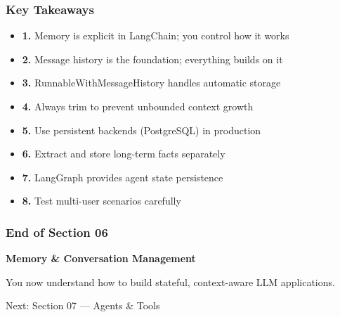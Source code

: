 \documentclass[aspectratio=169,11pt]{beamer}
\begin{document}
\begin{frame}
  \frametitle{Key Takeaways}
  \begin{itemize}
    \item \textcolor{lcgreen}{\textbf{1.}} Memory is explicit in LangChain; you control how it works
    \item \textcolor{lcgreen}{\textbf{2.}} Message history is the foundation; everything builds on it
    \item \textcolor{lcgreen}{\textbf{3.}} RunnableWithMessageHistory handles automatic storage
    \item \textcolor{lcgreen}{\textbf{4.}} Always trim to prevent unbounded context growth
    \item \textcolor{lcgreen}{\textbf{5.}} Use persistent backends (PostgreSQL) in production
    \item \textcolor{lcgreen}{\textbf{6.}} Extract and store long-term facts separately
    \item \textcolor{lcgreen}{\textbf{7.}} LangGraph provides agent state persistence
    \item \textcolor{lcgreen}{\textbf{8.}} Test multi-user scenarios carefully
  \end{itemize}
\end{frame}

\begin{frame}
  \frametitle{End of Section 06}
  \begin{center}
    \Large \textbf{Memory \& Conversation Management}

    \vspace{1em}

    You now understand how to build stateful, context-aware LLM applications.

    \vspace{1em}

    Next: Section 07 --- Agents \& Tools
  \end{center}
\end{frame}
\end{document}
